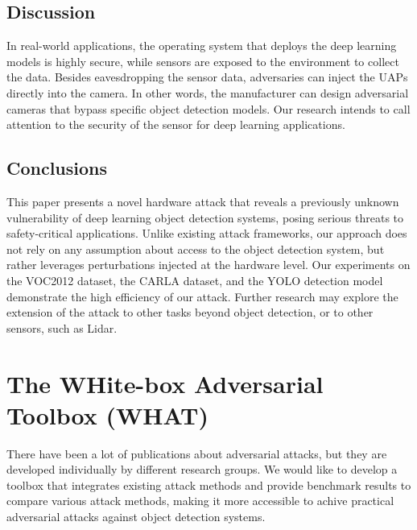 
\subsection{Discussion}

In real-world applications, the operating system that deploys the deep learning models is highly secure, while sensors are exposed to the environment to collect the data. Besides eavesdropping the sensor data, adversaries can inject the UAPs directly into the camera. In other words, the manufacturer can design adversarial cameras that bypass specific object detection models. Our research intends to call attention to the security of the sensor for deep learning applications. 





\subsection{Conclusions}


This paper presents a novel hardware attack that reveals a previously unknown vulnerability of deep learning object detection systems, posing serious threats to safety-critical applications. Unlike existing attack frameworks, our approach does not rely on any assumption about access to the object detection system, but rather leverages perturbations injected at the hardware level. Our experiments on the VOC2012 dataset, the CARLA dataset, and the YOLO detection model demonstrate the high efficiency of our attack. Further research may explore the extension of the attack to other tasks beyond object detection, or to other sensors, such as Lidar.


\section{The WHite-box Adversarial Toolbox (WHAT)}
\label{sec:what}

There have been a lot of publications about adversarial attacks, but they are developed individually by different research groups. We would like to develop a toolbox that integrates existing attack methods and provide benchmark results to compare various attack methods, making it more accessible to achive practical adversarial attacks against object detection systems.

